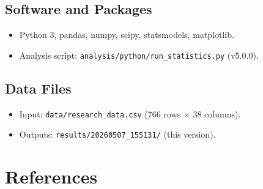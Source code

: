 \documentclass[12pt,a4paper]{article}
\begin{document}
\subsection{Software and Packages}
\begin{itemize}
    \item Python 3, pandas, numpy, scipy, statsmodels, matplotlib.
    \item Analysis script: \texttt{analysis/python/run\_statistics.py} (v5.0.0).
\end{itemize}

\subsection{Data Files}
\begin{itemize}
    \item Input: \texttt{data/research\_data.csv} (766 rows $\times$ 38 columns).
    \item Outputs: \texttt{results/20260507\_155131/} (this version).
\end{itemize}

\section*{References}
\end{document}
